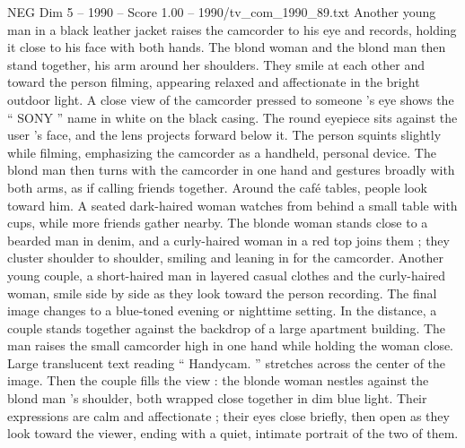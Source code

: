 \begin{textsample}{NEG Dim 5 – 1990 – Score 1.00 – 1990/tv\_com\_1990\_89.txt}
Another young man in a black leather jacket raises the camcorder to his eye and records, holding it close to his face with both hands.
The blond woman and the blond man then stand together, his arm around her shoulders.
They smile at each other and toward the person filming, appearing relaxed and affectionate in the bright outdoor light.
A close view of the camcorder pressed to someone ’s eye shows the “ SONY ” name in white on the black casing.
The round eyepiece sits against the user ’s face, and the lens projects forward below it.
The person squints slightly while filming, emphasizing the camcorder as a handheld, personal device.
The blond man then turns with the camcorder in one hand and gestures broadly with both arms, as if calling friends together.
Around the café tables, people look toward him.
A seated dark-haired woman watches from behind a small table with cups, while more friends gather nearby.
The blonde woman stands close to a bearded man in denim, and a curly-haired woman in a red top joins them ; they cluster shoulder to shoulder, smiling and leaning in for the camcorder.
Another young couple, a short-haired man in layered casual clothes and the curly-haired woman, smile side by side as they look toward the person recording.
The final image changes to a blue-toned evening or nighttime setting.
In the distance, a couple stands together against the backdrop of a large apartment building.
The man raises the small camcorder high in one hand while holding the woman close.
Large translucent text reading “ Handycam. ” stretches across the center of the image.
Then the couple fills the view : the blonde woman nestles against the blond man ’s shoulder, both wrapped close together in dim blue light.
Their expressions are calm and affectionate ; their eyes close briefly, then open as they look toward the viewer, ending with a quiet, intimate portrait of the two of them.

\end{textsample}
